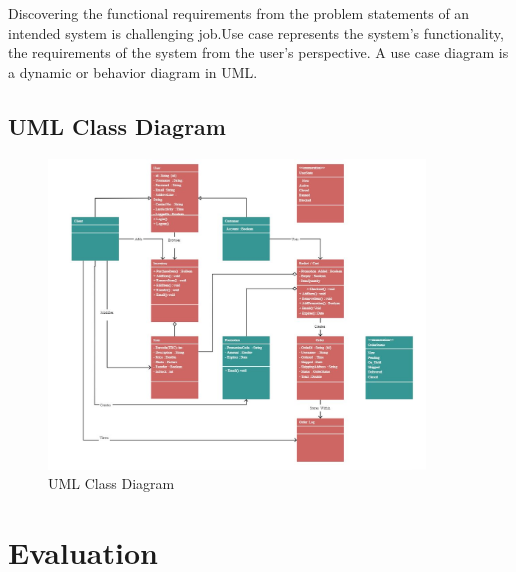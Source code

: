 \documentclass{report}
\begin{document}
Discovering the functional requirements from the problem statements of an intended system is challenging job.Use case represents the system’s functionality, the requirements of the system from the user’s perspective. A use case diagram is a dynamic or behavior diagram in UML.


\section{UML Class Diagram}

\begin{figure}[h]
    \centering
    \includegraphics[width=10cm]{uml_class_diagram/uml_class_diagram.jpeg
    }
    \caption{UML Class Diagram}
    \label{}
\end{figure}


\chapter{Evaluation}
\end{document}
